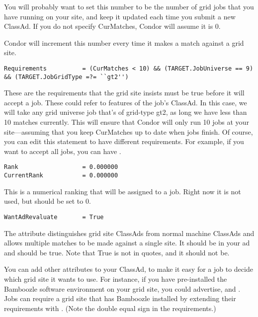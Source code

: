You will probably want to set this number to be the number of grid
jobs that you have running on your site, and keep it updated each time
you submit a new ClassAd. If you do not specify CurMatches, Condor
will assume it is 0.

Condor will increment this number every time it makes a match against
a grid site.

\footnotesize
\begin{verbatim}
Requirements          = (CurMatches < 10) && (TARGET.JobUniverse == 9) && (TARGET.JobGridType =?= ``gt2'')
\end{verbatim}
\normalsize

These are the requirements that the grid site insists must be true
before it will accept a job. These could refer to features of the
job's ClassAd. In this case, we will take any grid universe job that's
of grid-type gt2, as
long we have less than 10 matches currently. This will ensure that
Condor will only run 10 jobs at your site---assuming that you keep
CurMatches up to date when jobs finish. Of course, you can edit this
statement to have different requirements. For example, if you want to
accept all jobs, you can have .

\footnotesize
\begin{verbatim}
Rank                  = 0.000000
CurrentRank           = 0.000000
\end{verbatim}
\normalsize

This is a numerical ranking that will be assigned to a job. Right now
it is not used, but should be set to 0. 

\begin{verbatim}
WantAdRevaluate       = True
\end{verbatim}

The  attribute distinguishes grid site
ClassAds from normal machine ClassAds and allows multiple matches to
be made against a single site. It should be in your ad and should be
true. Note that True is not in quotes, and it should not be.

You can add other attributes to your ClassAd, to make it easy for a
job to decide which grid site it wants to use. For instance, if you
have pre-installed the Bamboozle software environment on your grid
site, you could advertise,  and
. Jobs can require a grid site that has
Bamboozle installed by extending their requirements with
. (Note the double equal sign in the
requirements.) 

